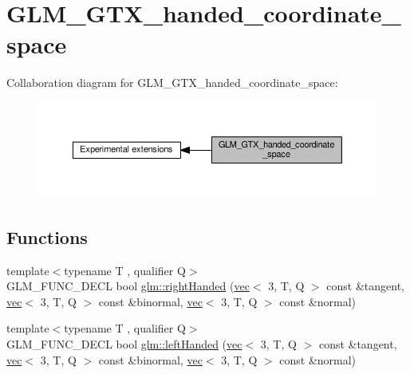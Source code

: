 \hypertarget{group__gtx__handed__coordinate__space}{}\section{G\+L\+M\+\_\+\+G\+T\+X\+\_\+handed\+\_\+coordinate\+\_\+space}
\label{group__gtx__handed__coordinate__space}
Collaboration diagram for G\+L\+M\+\_\+\+G\+T\+X\+\_\+handed\+\_\+coordinate\+\_\+space\+:
\nopagebreak
\begin{figure}[H]
\begin{center}
\leavevmode
\includegraphics[width=350pt]{d4/dff/group__gtx__handed__coordinate__space}
\end{center}
\end{figure}
\subsection*{Functions}
\begin{DoxyCompactItemize}
\item 
{\footnotesize template$<$typename T , qualifier Q$>$ }\\G\+L\+M\+\_\+\+F\+U\+N\+C\+\_\+\+D\+E\+CL bool \hyperlink{group__gtx__handed__coordinate__space_ga99386a5ab5491871b947076e21699cc8}{glm\+::right\+Handed} (\hyperlink{structglm_1_1vec}{vec}$<$ 3, T, Q $>$ const \&tangent, \hyperlink{structglm_1_1vec}{vec}$<$ 3, T, Q $>$ const \&binormal, \hyperlink{structglm_1_1vec}{vec}$<$ 3, T, Q $>$ const \&normal)
\item 
{\footnotesize template$<$typename T , qualifier Q$>$ }\\G\+L\+M\+\_\+\+F\+U\+N\+C\+\_\+\+D\+E\+CL bool \hyperlink{group__gtx__handed__coordinate__space_ga6f1bad193b9a3b048543d1935cf04dd3}{glm\+::left\+Handed} (\hyperlink{structglm_1_1vec}{vec}$<$ 3, T, Q $>$ const \&tangent, \hyperlink{structglm_1_1vec}{vec}$<$ 3, T, Q $>$ const \&binormal, \hyperlink{structglm_1_1vec}{vec}$<$ 3, T, Q $>$ const \&normal)
\end{DoxyCompactItemize}


